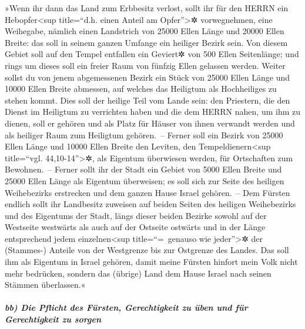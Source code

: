 »Wenn ihr dann das Land zum Erbbesitz verlost, sollt ihr
für den HERRN ein Hebopfer\textless sup title=``d.h. einen Anteil am
Opfer''\textgreater✲ vorwegnehmen, eine Weihegabe, nämlich einen
Landstrich von 25000 Ellen Länge und 20000 Ellen Breite: das soll in
seinem ganzen Umfange ein heiliger Bezirk sein. Von diesem
Gebiet soll auf den Tempel entfallen ein Geviert✲ von 500 Ellen
Seitenlänge; und rings um dieses soll ein freier Raum von fünfzig Ellen
gelassen werden. Weiter sollst du von jenem abgemessenen
Bezirk ein Stück von 25000 Ellen Länge und 10000 Ellen Breite abmessen,
auf welches das Heiligtum als Hochheiliges zu stehen kommt.
Dies soll der heilige Teil vom Lande sein: den Priestern,
die den Dienst im Heiligtum zu verrichten haben und die dem HERRN nahen,
um ihm zu dienen, soll er gehören und als Platz für Häuser von ihnen
verwandt werden und als heiliger Raum zum Heiligtum gehören.~--
Ferner soll ein Bezirk von 25000 Ellen Länge und 10000
Ellen Breite den Leviten, den Tempeldienern\textless sup title=``vgl.
44,10-14''\textgreater✲, als Eigentum überwiesen werden, für Ortschaften
zum Bewohnen.~-- Ferner sollt ihr der Stadt ein Gebiet von
5000 Ellen Breite und 25000 Ellen Länge als Eigentum überweisen; es soll
sich zur Seite des heiligen Weihebezirks erstrecken und dem ganzen Hause
Israel gehören.~-- Dem Fürsten endlich sollt ihr
Landbesitz zuweisen auf beiden Seiten des heiligen Weihebezirks und des
Eigentums der Stadt, längs dieser beiden Bezirke sowohl auf der
Westseite westwärts als auch auf der Ostseite ostwärts und in der Länge
entsprechend jedem einzelnen\textless sup title=``=~genauso wie
jeder''\textgreater✲ der (Stammes-) Anteile von der Westgrenze bis zur
Ostgrenze des Landes. Das soll ihm als Eigentum in Israel
gehören, damit meine Fürsten hinfort mein Volk nicht mehr bedrücken,
sondern das (übrige) Land dem Hause Israel nach seinen Stämmen
überlassen.«

\hypertarget{bb-die-pflicht-des-fuxfcrsten-gerechtigkeit-zu-uxfcben-und-fuxfcr-gerechtigkeit-zu-sorgen}{%
\subparagraph{bb) Die Pflicht des Fürsten, Gerechtigkeit zu üben und für
Gerechtigkeit zu
sorgen}\label{bb-die-pflicht-des-fuxfcrsten-gerechtigkeit-zu-uxfcben-und-fuxfcr-gerechtigkeit-zu-sorgen}}


